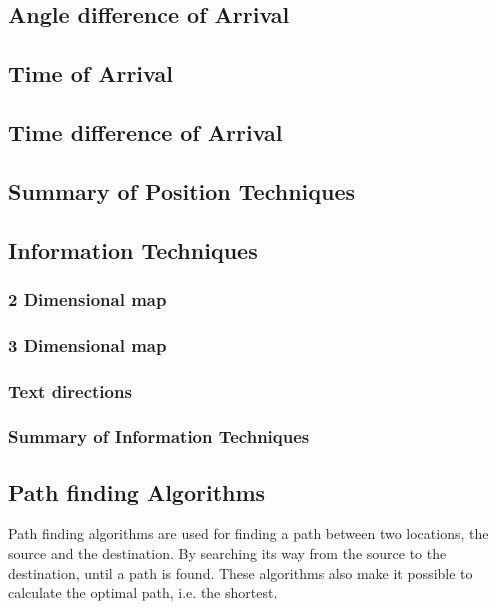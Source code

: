   \subsection{Angle difference of Arrival}

  \subsection{Time of Arrival}

  \subsection{Time difference of Arrival}

  

  \subsection{Summary of Position Techniques}

  \subsection{Information Techniques}

  \subsubsection{2 Dimensional map}

  \subsubsection{3 Dimensional map}

  \subsubsection{Text directions}

  \subsubsection{Summary of Information Techniques}

\newpage

\subsection{Path finding Algorithms}

  Path finding algorithms are used for finding a path between two locations, the source and the destination. By searching its way from the source to the destination, until a path is found. These algorithms also make it possible to calculate the optimal path, i.e. the shortest.


